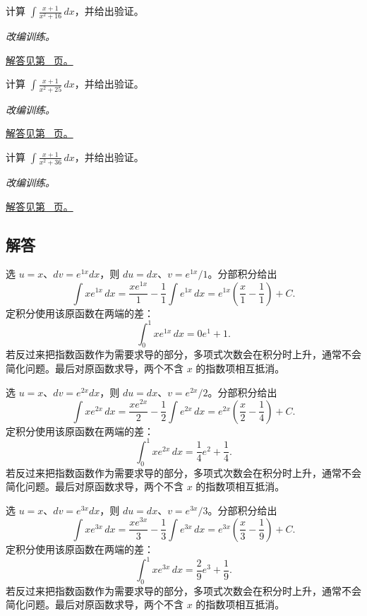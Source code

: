 \documentclass[UTF8,12pt,a4paper,fontset=fandol]{ctexart}
\begin{document}
\begin{example}[不可约二次因子的积分]\label{ex:c13q22}
计算 $\displaystyle\int\frac{x+1}{x^2+16}\,dx$，并给出验证。
\par\textit{改编训练。}\par\hyperref[ans:c13q22]{解答见第~\pageref{ans:c13q22} 页。}
\end{example}
\begin{example}[不可约二次因子的积分]\label{ex:c13q23}
计算 $\displaystyle\int\frac{x+1}{x^2+25}\,dx$，并给出验证。
\par\textit{改编训练。}\par\hyperref[ans:c13q23]{解答见第~\pageref{ans:c13q23} 页。}
\end{example}
\begin{example}[不可约二次因子的积分]\label{ex:c13q24}
计算 $\displaystyle\int\frac{x+1}{x^2+36}\,dx$，并给出验证。
\par\textit{改编训练。}\par\hyperref[ans:c13q24]{解答见第~\pageref{ans:c13q24} 页。}
\end{example}
\subsection{解答}
\begin{solve}\label{ans:c13q1}
选 $u=x$、$dv=e^{1x}dx$，则 $du=dx$、$v=e^{1x}/1$。分部积分给出
\[
\int xe^{1x}\,dx=\frac{xe^{1x}}{1}-\frac1{1}\int e^{1x}\,dx=e^{1x}\left(\frac x{1}-\frac1{1}\right)+C.
\]
定积分使用该原函数在两端的差：
\[
\int_0^1xe^{1x}\,dx=0e^{1}+1.
\]
若反过来把指数函数作为需要求导的部分，多项式次数会在积分时上升，通常不会简化问题。最后对原函数求导，两个不含 $x$ 的指数项相互抵消。
\end{solve}

\begin{solve}\label{ans:c13q2}
选 $u=x$、$dv=e^{2x}dx$，则 $du=dx$、$v=e^{2x}/2$。分部积分给出
\[
\int xe^{2x}\,dx=\frac{xe^{2x}}{2}-\frac1{2}\int e^{2x}\,dx=e^{2x}\left(\frac x{2}-\frac1{4}\right)+C.
\]
定积分使用该原函数在两端的差：
\[
\int_0^1xe^{2x}\,dx=\frac{1}{4}e^{2}+\frac{1}{4}.
\]
若反过来把指数函数作为需要求导的部分，多项式次数会在积分时上升，通常不会简化问题。最后对原函数求导，两个不含 $x$ 的指数项相互抵消。
\end{solve}

\begin{solve}\label{ans:c13q3}
选 $u=x$、$dv=e^{3x}dx$，则 $du=dx$、$v=e^{3x}/3$。分部积分给出
\[
\int xe^{3x}\,dx=\frac{xe^{3x}}{3}-\frac1{3}\int e^{3x}\,dx=e^{3x}\left(\frac x{3}-\frac1{9}\right)+C.
\]
定积分使用该原函数在两端的差：
\[
\int_0^1xe^{3x}\,dx=\frac{2}{9}e^{3}+\frac{1}{9}.
\]
若反过来把指数函数作为需要求导的部分，多项式次数会在积分时上升，通常不会简化问题。最后对原函数求导，两个不含 $x$ 的指数项相互抵消。
\end{solve}
\end{document}
